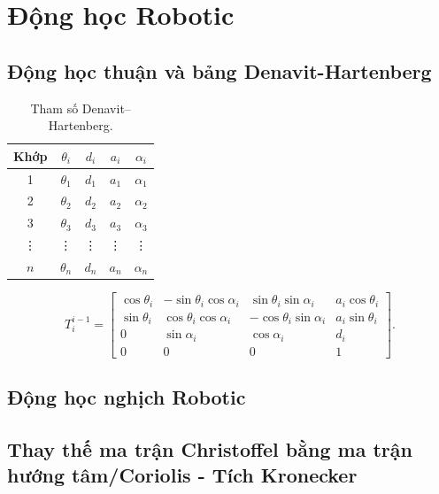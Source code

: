 \section{Động học Robotic}

\subsection{Động học thuận và bảng Denavit-Hartenberg}

\begin{table}[h]
    \centering
    \caption{Tham số Denavit–Hartenberg.}
    \begin{tabular}{|c|c|c|c|c|}
        \hline
        \textbf{Khớp} & \( \theta_i \) & \( d_i \) & \( a_i \) & \( \alpha_i \) \\
        \hline
        1 & \( \theta_1 \) & \( d_1 \) & \( a_1 \) & \( \alpha_1 \) \\
        \hline
        2 & \( \theta_2 \) & \( d_2 \) & \( a_2 \) & \( \alpha_2 \) \\
        \hline
        3 & \( \theta_3 \) & \( d_3 \) & \( a_3 \) & \( \alpha_3 \) \\
        \hline
        \vdots & \vdots & \vdots & \vdots & \vdots \\
        \hline
        \( n \) & \( \theta_n \) & \( d_n \) & \( a_n \) & \( \alpha_n \) \\
        \hline
    \end{tabular}
\end{table}

\begin{equation}
    T_i^{i-1} =
    \left[ \begin{array}{cccc}
    \cos\theta_i & -\sin\theta_i \cos\alpha_i & \sin\theta_i \sin\alpha_i & a_i \cos\theta_i \\
    \sin\theta_i & \cos\theta_i \cos\alpha_i & -\cos\theta_i \sin\alpha_i & a_i \sin\theta_i \\
    0 & \sin\alpha_i & \cos\alpha_i & d_i \\
    0 & 0 & 0 & 1
    \end{array} \right].
\end{equation}

\subsection{Động học nghịch Robotic}

\subsection{Thay thế ma trận Christoffel bằng ma trận hướng tâm/Coriolis - Tích Kronecker}

